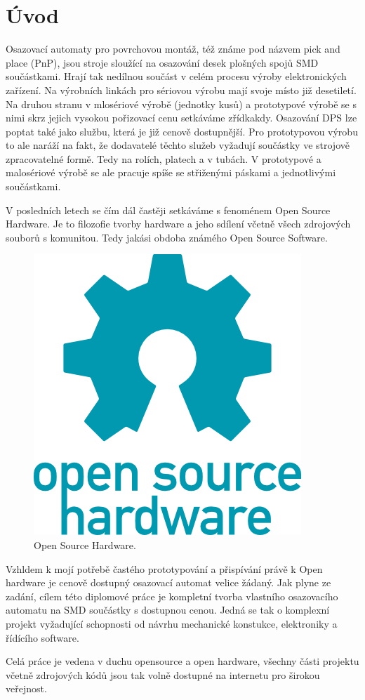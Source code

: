 \chapter*{Úvod}
{}


Osazovací automaty pro povrchovou montáž, též známe pod názvem pick and place (PnP), jsou stroje sloužící na osazování desek plošných spojů SMD součástkami. Hrají tak nedílnou součást v celém procesu výroby elektronických zařízení. 
Na výrobních linkách pro sériovou výrobu mají svoje místo již desetiletí. Na druhou stranu v mlosériové výrobě (jednotky kusů) a prototypové výrobě se s nimi skrz jejich vysokou pořizovací cenu setkáváme zřídkakdy.
Osazování DPS lze poptat také jako službu, která je již cenově dostupnější. Pro prototypovou výrobu to ale naráží na fakt, že dodavatelé těchto služeb vyžadují součástky ve strojově zpracovatelné formě. Tedy na rolích, platech a v tubách. V prototypové a malosériové výrobě se ale pracuje spíše se střiženými  páskami a jednotlivými součástkami.

\bigskip
V posledních letech se čím dál častěji setkáváme s fenoménem Open Source Hardware. Je to filozofie tvorby hardware a jeho sdílení včetně všech zdrojových souborů s komunitou. Tedy jakási obdoba známého Open Source Software.

\begin{figure}[h!]

  \centering
    \includegraphics[width=0.4\linewidth]{obrazky/openhw.png}%
    \caption{Open Source Hardware.}
\end{figure}

Vzhldem k mojí potřebě častého prototypování a přispívání právě k Open hardware je cenově dostupný osazovací automat velice žádaný. Jak plyne ze zadání, cílem této diplomové práce je kompletní tvorba vlastního osazovacího automatu na SMD součástky s dostupnou cenou. Jedná se tak o komplexní projekt vyžadující schopnosti od návrhu mechanické konstukce, elektroniky a řídícího software.

 Celá práce je vedena v duchu opensource a open hardware, všechny části projektu včetně zdrojových kódů jsou tak volně dostupné na internetu pro širokou veřejnost.
